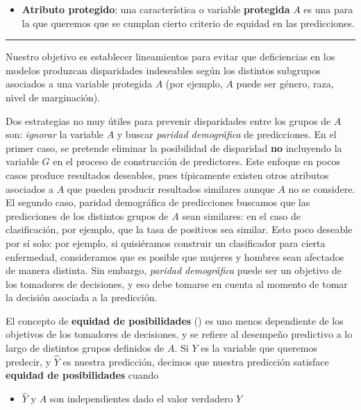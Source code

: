 \documentclass[
]{book}
\providecommand{\tightlist}{%
  \setlength{\itemsep}{0pt}\setlength{\parskip}{0pt}}
\begin{document}
\begin{itemize}
\tightlist
\item
  \textbf{Atributo protegido}: una característica o variable \textbf{protegida} \(A\) es una para la que queremos
  que se cumplan cierto criterio de equidad en las predicciones.
\end{itemize}

\begin{center}\rule{0.5\linewidth}{0.5pt}\end{center}

Nuestro objetivo es establecer
lineamientos para evitar que deficiencias en los modelos produzcan disparidades indeseables según los
distintos subgrupos asociados a una variable protegida \(A\) (por ejemplo, \(A\) puede ser género, raza, nivel de marginación).

Dos estrategias no muy útiles para prevenir disparidades entre los grupos de \(A\) son: \emph{ignorar} la variable \(A\) y
buscar \emph{paridad demográfica} de predicciones. En el primer caso, se pretende eliminar la posibilidad de disparidad \textbf{no} incluyendo
la variable \(G\) en el proceso de construcción de predictores. Este enfoque en pocos casos produce resultados deseables,
pues típicamente existen otros atributos asociados a \(A\) que pueden producir resultados similares aunque \(A\) no se considere.
El segundo caso, paridad demográfica de predicciones buscamos que las predicciones de los distintos grupos de \(A\) sean
similares: en el caso de clasificación, por ejemplo, que la tasa de positivos sea similar. Esto poco deseable
por sí solo: por ejemplo, si quisiéramos construir un clasificador para cierta enfermedad, consideramos que es posible que
mujeres y hombres sean afectados de manera distinta. Sin embargo, \emph{paridad demográfica} puede ser un objetivo de los tomadores
de decisiones, y eso debe tomarse en cuenta al momento de tomar la decisión asociada a la predicción.

El concepto de \textbf{equidad de posibilidades} (\citep{hardt}) es uno menos dependiente de los objetivos de los tomadores de decisiones,
y se refiere al desempeño predictivo a lo largo de distintos grupos definidos de \(A\). Si \(Y\) es la variable que queremos
predecir, y \(\hat{Y}\) es nuestra predicción, decimos que nuestra predicción satisface \textbf{equidad de posibilidades} cuando

\begin{itemize}
\tightlist
\item
  \(\hat{Y}\) y \(A\) son independientes dado el valor verdadero \(Y\)
\end{itemize}
\end{document}
